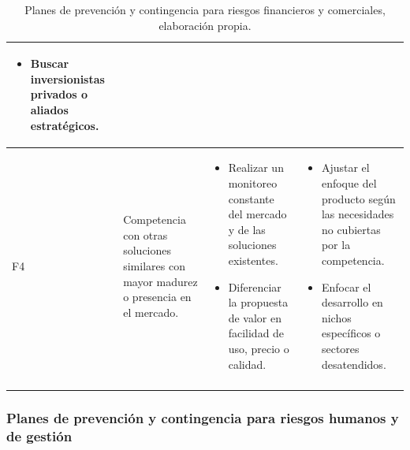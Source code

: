 \begin{longtable}{|>{\centering\arraybackslash}p{0.8cm}|>{\raggedright\arraybackslash}p{3.5cm}|>{\raggedright\arraybackslash}p{5.1cm}|>{\raggedright\arraybackslash}p{5.1cm}|}
\begin{itemize}
		\item Buscar inversionistas privados o aliados estratégicos.
	\end{itemize} \\
	\hline
	F4 & Competencia con otras soluciones similares con mayor madurez o presencia en el mercado. &
	\begin{itemize}
		\item Realizar un monitoreo constante del mercado y de las soluciones existentes.
		\item Diferenciar la propuesta de valor en facilidad de uso, precio o calidad.
	\end{itemize} &
	\begin{itemize}
		\item Ajustar el enfoque del producto según las necesidades no cubiertas por la competencia.
		\item Enfocar el desarrollo en nichos específicos o sectores desatendidos.
	\end{itemize} \\
	\hline
	 \caption[Planes de prevención y contingencia para riesgos financieros y comerciales]{Planes de prevención y contingencia para riesgos financieros y comerciales, elaboración propia.} \label{tab:riesgos_financieros}\\
\end{longtable}

\newpage

\subsubsection{Planes de prevención y contingencia para riesgos humanos y de gestión}

\setlength{\tabcolsep}{4pt}
\renewcommand{\arraystretch}{1.2}

